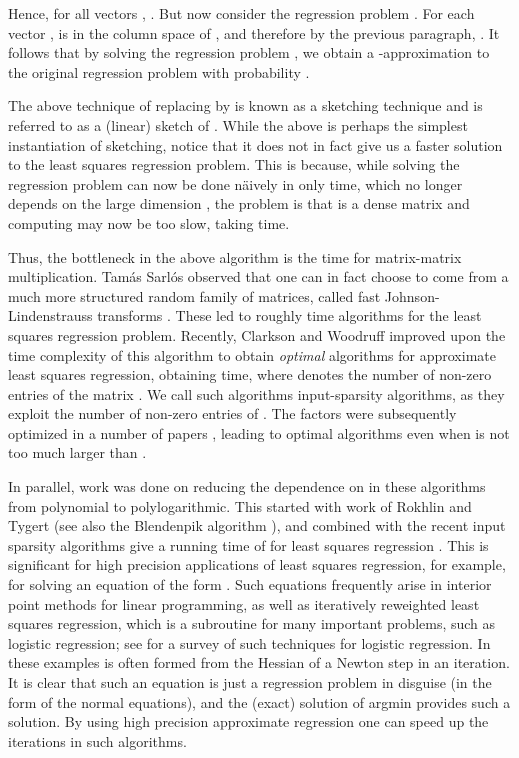 \documentclass[11pt]{article}
\begin{document}
Hence, for all vectors
, . But now consider the regression
problem . For each vector ,
 is in the column space of , and therefore by the previous paragraph,
. It follows that by solving the regression
problem , we obtain a -approximation to the original
regression problem with probability . 

The above technique of replacing  by  is known as a sketching technique
and  is referred to as a (linear) sketch of . While the above
is perhaps the simplest instantiation of sketching, notice that it does not in
fact give us a faster solution to the least squares regression problem. This is because,
while solving the regression problem  can now be done n\"aively
in only  time, which no longer depends on the large dimension , the
problem is that  is a dense matrix and computing  may now be too slow,
taking  time. 

Thus, the bottleneck in the above algorithm is the time for matrix-matrix multiplication. 
Tam\'{a}s Sarl\'{o}s observed \cite{S06} that one can in fact
choose  to come from a much more structured random family of matrices, called
fast Johnson-Lindenstrauss transforms \cite{AC06}. These led to roughly 
time algorithms for the least squares regression problem. Recently, Clarkson
and Woodruff \cite{CW13} improved upon the time complexity of this algorithm to obtain 
{\it optimal} algorithms for approximate least squares
regression, obtaining  time, where  denotes
the number of non-zero entries of the matrix . We call such algorithms input-sparsity
algorithms, as they exploit the number of non-zero entries of . 
The  factors
were subsequently optimized in a number of papers \cite{MM13,JH13,bn13}, leading to optimal algorithms
even when  is not too much larger than . 

In parallel, work was done on reducing the dependence on  in these algorithms from polynomial to polylogarithmic. This started with work of Rokhlin and Tygert \cite{RT08} (see also the Blendenpik algorithm \cite{amt10}), and combined with the recent input sparsity algorithms give a running time of  for least squares regression \cite{CW13}. This is significant for high precision applications of least squares regression, for example, for solving an equation of the form . Such equations frequently arise in interior point methods for linear programming, as well as iteratively reweighted least squares regression, which is a subroutine for many important problems, such as logistic regression; see
\cite{M03Compare} for a survey of such techniques for logistic regression. In these examples  is often formed from the Hessian of a Newton step in an iteration. It is clear that such an equation is just a regression problem in disguise (in the form of the normal equations), and the (exact) solution of argmin provides such a solution. By using high precision approximate regression one can speed up the iterations in such algorithms. 
\end{document}
